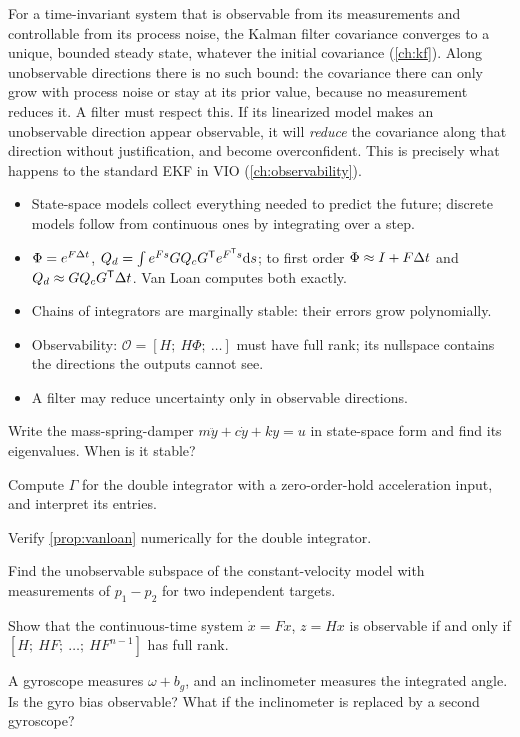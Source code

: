 For a time-invariant system that is observable from its measurements and controllable from its process noise, the Kalman filter covariance
converges to a unique, bounded steady state, whatever the initial covariance (\cref{ch:kf}). Along unobservable directions there is no such
bound: the covariance there can only grow with process noise or stay at its prior value, because no measurement reduces it. A filter must
respect this. If its linearized model makes an unobservable direction appear observable, it will \emph{reduce} the covariance along that direction
without justification, and become overconfident. This is precisely what happens to the standard EKF in VIO (\cref{ch:observability}).

\begin{takeaways}
\begin{itemize}
  \item State-space models collect everything needed to predict the future; discrete models follow from continuous ones by integrating over
        a step.
  \item $\Phi = e^{F{\Delta t}}$, $Q_d = \int e^{Fs}GQ_cG^{\mathsf{T}} e^{F^{\mathsf{T}} s}\mathrm{d} s$; to first order $\Phi \approx I + F{\Delta t}$ and $Q_d \approx GQ_cG^{\mathsf{T}}{\Delta t}$. Van Loan computes both exactly.
  \item Chains of integrators are marginally stable: their errors grow polynomially.
  \item Observability: $\mathcal O = [H;\ H\Phi;\ \dots]$ must have full rank; its nullspace contains the directions the outputs cannot see.
  \item A filter may reduce uncertainty only in observable directions.
\end{itemize}
\end{takeaways}

\begin{exercises}
  \item Write the mass-spring-damper $m\ddot y + c\dot y + ky = u$ in state-space form and find its eigenvalues. When is it stable?
  \item Compute $\Gamma$ for the double integrator with a zero-order-hold acceleration input, and interpret its entries.
  \item Verify \cref{prop:vanloan} numerically for the double integrator.
  \item Find the unobservable subspace of the constant-velocity model with measurements of $p_1 - p_2$ for two independent targets.
  \item Show that the continuous-time system $\dot x = Fx$, $z = Hx$ is observable if and only if $[H;\ HF;\ \dots;\ HF^{n-1}]$ has full rank.
  \item A gyroscope measures $\omega + b_g$, and an inclinometer measures the integrated angle. Is the gyro bias observable? What if the inclinometer
        is replaced by a second gyroscope?
\end{exercises}

